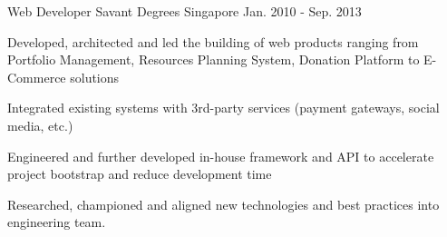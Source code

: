 \begin{cventries}
  \cventry
    {Web Developer} %
    {Savant Degrees} %
    {Singapore} %
    {Jan. 2010 - Sep. 2013} %
    {
      \begin{cvitems} %
        \item {Developed, architected and led the building of web products
            ranging from Portfolio Management, Resources Planning System,
            Donation Platform to E-Commerce solutions}
        \item {Integrated existing systems with 3rd-party services (payment
            gateways, social media, etc.)}
        \item {Engineered and further developed in-house framework and API to
            accelerate project bootstrap and reduce development time}
        \item {Researched, championed and aligned new technologies and best
            practices into engineering team.}
      \end{cvitems}
    }

\end{cventries}
